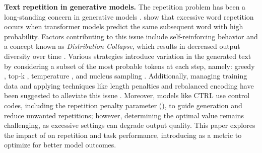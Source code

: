 
\textbf{Text repetition in generative models.} The repetition problem has been a long-standing concern in generative models \cite{Holtzman2019TheCC, Welleck2019NeuralTG}. \citet{Fu2020ATA} show that excessive word repetition occurs when transformer models predict the same subsequent word with high probability. Factors contributing to this issue include self-reinforcing behavior \cite{xu2022learning} and a concept known as \textit{Distribution Collapse}, which results in decreased output diversity over time \cite{emrullah2024self}. 
Various strategies introduce variation in the generated text by considering a subset of the most probable tokens at each step, namely: greedy \cite{klein-etal-2017-opennmt}, top-k \cite{fan-etal-2018-hierarchical}, temperature \cite{ficler-goldberg-2017-controlling, Caccia2020Language}, and nucleus sampling \cite{Holtzman2019TheCC}. 
Additionally, managing training data and applying techniques like length penalties and rebalanced encoding have been suggested to alleviate this issue \cite{wu2016googles, klein-etal-2017-opennmt, Fu2020ATA}. 
Moreover, models like CTRL \cite{Keskar2019CTRLAC} use control codes, including the repetition penalty parameter (\rp), to guide generation and reduce unwanted repetitions; however, determining the optimal \rp value remains challenging, as excessive settings can degrade output quality. This paper explores the impact of \rp on repetition and task performance, introducing \rap as a metric to optimize \rp for better model outcomes.

